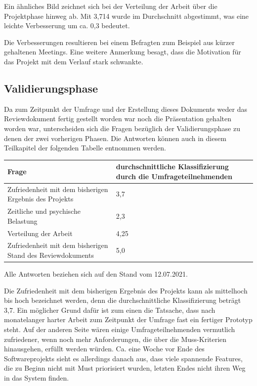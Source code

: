 \documentclass[../review_3.tex]{subfiles}
\begin{document}
Ein ähnliches Bild zeichnet sich bei der Verteilung der Arbeit über die Projektphase hinweg ab. Mit 3,714 wurde im Durchschnitt abgestimmt, was eine leichte Verbesserung um ca. 0,3 bedeutet.

Die Verbesserungen resultieren bei einem Befragten zum Beispiel aus kürzer gehaltenen Meetings. Eine weitere Anmerkung besagt, dass die Motivation für das Projekt mit dem Verlauf stark schwankte.

\subsection{Validierungsphase}

Da zum Zeitpunkt der Umfrage und der Erstellung dieses Dokuments weder das Reviewdokument fertig gestellt worden war noch die Präsentation gehalten worden war, unterscheiden sich die Fragen bezüglich der Validierungsphase zu denen der zwei vorherigen Phasen. Die Antworten können auch in diesem Teilkapitel der folgenden Tabelle entnommen werden.

\newpage
%
%
%
%

\begin{tabular}[t]{p{} p{}}
    \toprule
    \textbf{Frage} & \textbf{durchschnittliche Klassifizierung durch die Umfrageteilnehmenden}\\ \midrule
    Zufriedenheit mit dem bisherigen Ergebnis des Projekts & 3,7\\
    Zeitliche und psychische Belastung & 2,3 \\
    Verteilung der Arbeit & 4,25 \\
    Zufriedenheit mit dem bisherigen Stand des Reviewdokuments & 5,0 \\
    \bottomrule
\end{tabular}

Alle Antworten beziehen sich auf den Stand vom 12.07.2021.

Die Zufriedenheit mit dem bisherigen Ergebnis des Projekts kann als mittelhoch bis hoch bezeichnet werden, denn die durchschnittliche Klassifizierung beträgt 3,7. Ein möglicher Grund dafür ist zum einen die Tatsache, dass nach monatelanger harter Arbeit zum Zeitpunkt der Umfrage fast ein fertiger Prototyp steht. Auf der anderen Seite wären einige Umfrageteilnehmenden vermutlich zufriedener, wenn noch mehr Anforderungen, die über die Muss-Kriterien hinausgehen, erfüllt werden würden. Ca. eine Woche vor Ende des Softwareprojekts sieht es allerdings danach aus, dass viele spannende Features, die zu Beginn nicht mit Must priorisiert wurden, letzten Endes nicht ihren Weg in das System finden.
\end{document}
